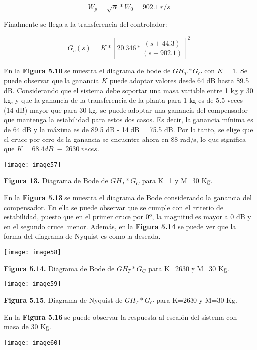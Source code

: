 \documentclass{article} %
\begin{document}
\[W_p=\sqrt{\alpha }*W_0=902.1\ r/s\] 


\noindent Finalmente se llega a la transferencia del controlador:

\noindent 
\[G_c(s)=K*{[20.346*\frac{(s+44.3)}{(s+902.1)}]}^2\] 


\noindent En la \textbf{Figura 5.10 }se muestra el diagrama de bode de ${GH}_T*G_C$ con $K=1$. Se puede observar que la ganancia $K$ puede adoptar valores desde 64 dB hasta 89.5 dB. Considerando que el sistema debe soportar una masa variable entre 1 kg y 30 kg, y que la ganancia de la transferencia de la planta para 1 kg es de 5.5 veces (14 dB) mayor que para 30 kg, se puede adoptar una ganancia del compensador que mantenga la estabilidad para estos dos casos. Es decir, la ganancia m\'{i}nima es de 64 dB y la m\'{a}xima es de 89.5 dB - 14 dB = 75.5 dB. Por lo tanto, se elige que el cruce por cero de la ganancia se encuentre ahora en 88 rad/s, lo que significa que $K=68.4dB\ \equiv \ 2630\ veces$.

\noindent 

\noindent \texttt{[image: image57]}

\noindent \textbf{Figura 13. }Diagrama de Bode de ${GH}_T*G_C$ para K=1 y M=30 Kg.

\noindent 

\noindent En la \textbf{Figura 5.13} se muestra el diagrama de Bode considerando la ganancia del compensador. En ella se puede observar que se  cumple con el criterio de estabilidad, puesto que en el primer cruce por 0º, la magnitud es mayor a 0 dB y en el segundo cruce, menor. Adem\'{a}s, en la \textbf{Figura 5.14} se puede ver que la forma del diagrama de Nyquist es como la deseada.

\noindent \texttt{[image: image58]}

\noindent \textbf{Figura 5.14. }Diagrama de Bode de ${GH}_T*G_C$ para K=2630 y M=30 Kg.

\noindent 

\noindent \texttt{[image: image59]}

\noindent \textbf{Figura 5.15}. Diagrama de Nyquist de ${GH}_T*G_C$ para K=2630 y M=30 Kg.

\noindent 

\noindent En la \textbf{Figura 5.16} se puede observar la respuesta al escal\'{o}n del sistema con masa de 30 Kg.

\noindent \texttt{[image: image60]}
\end{document}
